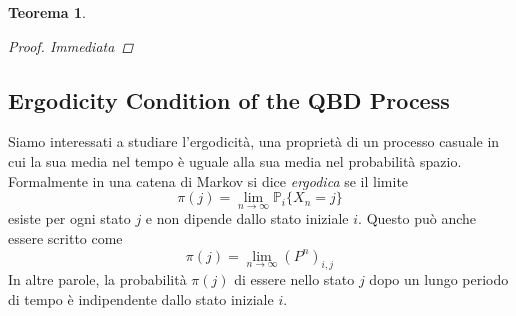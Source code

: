 \documentclass[11pt]{article}
\newtheorem{teorema}{Teorema}[section]
\begin{document}
\begin{teorema}
    \begin{proof}
        Immediata
    \end{proof}

\end{teorema}
\clearpage

\subsection{Ergodicity Condition of the QBD Process}

Siamo interessati a studiare l'ergodicità, una proprietà di un processo casuale in cui la sua media nel tempo è uguale alla sua media nel probabilità spazio. Formalmente in una catena di Markov si dice \emph{ergodica} se il limite
$$ \pi(j) = \lim_{n\to \infty} \mathbb{P}_i \{X_n = j\} $$
esiste per ogni stato $j$ e non dipende dallo stato iniziale $i$. Questo può anche essere scritto come
$$ \pi(j) = \lim_{n \to \infty} (P^n)_{i,j} $$
In altre parole, la probabilità $\pi(j)$ di essere nello stato $j$ dopo un lungo periodo di tempo è indipendente dallo stato iniziale $i$.
\end{document}
